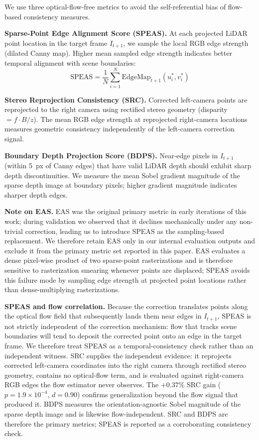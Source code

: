 \documentclass[conference]{IEEEtran}
\begin{document}
We use three optical-flow-free metrics to avoid
the self-referential bias of flow-based consistency measures.

\textbf{Sparse-Point Edge Alignment Score (SPEAS).}
At each projected LiDAR point location in the target frame
$I_{t+1}$, we sample the local RGB edge strength (dilated Canny
map). Higher mean sampled edge strength indicates better temporal
alignment with scene boundaries:
\begin{equation}
  \text{SPEAS} = \frac{1}{N}\sum_{i=1}^{N}
    \text{EdgeMap}_{t+1}(u_i^*, v_i^*)
\end{equation}

\textbf{Stereo Reprojection Consistency (SRC).}
Corrected left-camera points are reprojected to the right camera
using rectified stereo geometry (disparity $= f \cdot B / z$).
The mean RGB edge strength at reprojected right-camera locations
measures geometric consistency independently of the left-camera
correction signal.

\textbf{Boundary Depth Projection Score (BDPS).}
Near-edge pixels in $I_{t+1}$ (within 5~px of Canny edges) that
have valid LiDAR depth should exhibit sharp depth
discontinuities. We measure the mean Sobel gradient magnitude of
the sparse depth image at boundary pixels; higher gradient
magnitude indicates sharper depth edges.

\textbf{Note on EAS.}
EAS was the original primary metric in early iterations of
this work; during validation we observed that it declines
mechanically under any non-trivial correction, leading us to
introduce SPEAS as the sampling-based replacement. We
therefore retain EAS only in our internal evaluation outputs
and exclude it from the primary metric set reported in this
paper. EAS evaluates a dense pixel-wise product of two
sparse-point rasterizations and is therefore sensitive to
rasterization smearing whenever points are displaced; SPEAS
avoids this failure mode by sampling edge strength at
projected point locations rather than dense-multiplying
rasterizations.

\textbf{SPEAS and flow correlation.}
Because the correction translates points along the optical
flow field that subsequently lands them near edges in
$I_{t+1}$, SPEAS is not strictly independent of the correction
mechanism: flow that tracks scene boundaries will tend to
deposit the corrected point onto an edge in the target frame.
We therefore treat SPEAS as a temporal-consistency check
rather than an independent witness. SRC supplies the
independent evidence: it reprojects corrected left-camera
coordinates into the right camera through rectified stereo
geometry, contains no optical-flow term, and is evaluated
against right-camera RGB edges the flow estimator never
observes. The $+0.37\%$ SRC gain
($p{=}1.9{\times}10^{-4}$, $d{=}0.90$) confirms generalization
beyond the flow signal that produced it. BDPS measures the
orientation-agnostic Sobel magnitude of the sparse depth image
and is likewise flow-independent. SRC and BDPS are therefore
the primary metrics; SPEAS is reported as a corroborating
consistency check.
\end{document}
